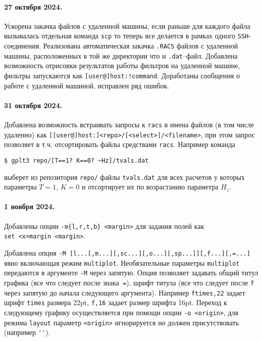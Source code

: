 \documentclass[12pt]{article}
\begin{document}
\paragraph{27 октября 2024.} Ускорена закачка файлов с удаленной машины, если раньше для каждого файла вызывалась отдельная команда \verb'scp'
то теперь все делается в рамках одного \verb'SSH'-соединения. Реализована автоматическая закачка \verb'.RACS' файлов с удаленной машины, расположенных
в той же директории что и \verb'.dat'--файл.  Добавлена возможность отрисовки результатов работы фильтров на удаленной машине,
фильтры запускаются как \verb'[user@]host:!command'. Доработаны сообщения о работе с удаленной машиной, исправлен ряд ошибок.

\paragraph{31 октября 2024.} Добавлена возможность встраивать запросы к \verb'racs'  в имена файлов (в том числе удаленно) как 
   \verb'[[user@]host:]<repo>/[<select>]/<filename>', при этом запрос позволяет в т.ч. отсортировать файлы средствами \verb'racs'.
Например команда
\begin{verbatim}
$ gplt3 repo/[T==1? K==0? ~Hz]/tvals.dat
\end{verbatim}
выберет из репозитория \verb'repo/' файлы \verb'tvals.dat' для всех расчетов у которых параметры $T=1$, $K=0$ и отсортирует их по возрастанию параметра $H_z$.

\paragraph{1 ноября 2024.} Добавлены опции \verb'-m{l,r,t,b} <margin>' для задания полей как\\ \verb'set <x>margin <margin>'.

Добавлена опция \verb'-M [l...[,m...][,sc...][,o...][,sp...]][,f...][,=...]' явно включающая режим \verb'multiplot'.
Необязательные параметры \verb'multiplot' передаются в аргументе \verb'-M'  через запятую.
Опция позволяет задавать общий титул графика (все что следует после знака~\verb'='),
шрифт титула (все что следует после \verb'f' через запятую до начала следующего аргумента).
Например \verb'ftimes,22' задает шрифт \verb'times' размера 22pt,  \verb'f,16' задает размер шрифта 16pt.
Переход к следующему графику осуществляется при помощи опции \verb'-o <origin>', для 
режима \verb'layout' параметр  \verb'<origin>' игнорируется но должен присутствовать (например \verb|''|). 
\end{document}
